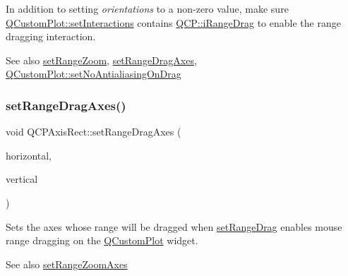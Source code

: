 In addition to setting {\itshape orientations} to a non-\/zero value, make sure \mbox{\hyperlink{class_q_custom_plot_a5ee1e2f6ae27419deca53e75907c27e5}{Q\+Custom\+Plot\+::set\+Interactions}} contains \mbox{\hyperlink{namespace_q_c_p_a2ad6bb6281c7c2d593d4277b44c2b037a2c4432b9aceafb94000be8d1b589ef18}{Q\+C\+P\+::i\+Range\+Drag}} to enable the range dragging interaction.

\begin{DoxySeeAlso}{See also}
\mbox{\hyperlink{class_q_c_p_axis_rect_a7960a9d222f1c31d558b064b60f86a31}{set\+Range\+Zoom}}, \mbox{\hyperlink{class_q_c_p_axis_rect_a648cce336bd99daac4a5ca3e5743775d}{set\+Range\+Drag\+Axes}}, \mbox{\hyperlink{class_q_custom_plot_a775bdcb6329d44701aeaa6135b0e5265}{Q\+Custom\+Plot\+::set\+No\+Antialiasing\+On\+Drag}} 
\end{DoxySeeAlso}
\mbox{\label{class_q_c_p_axis_rect_a648cce336bd99daac4a5ca3e5743775d}} 
\subsubsection{\texorpdfstring{set\+Range\+Drag\+Axes()}{setRangeDragAxes()}}
{\footnotesize\ttfamily void Q\+C\+P\+Axis\+Rect\+::set\+Range\+Drag\+Axes (\begin{DoxyParamCaption}\item[{\mbox{\hyperlink{class_q_c_p_axis}{Q\+C\+P\+Axis}} $\ast$}]{horizontal,  }\item[{\mbox{\hyperlink{class_q_c_p_axis}{Q\+C\+P\+Axis}} $\ast$}]{vertical }\end{DoxyParamCaption})}

Sets the axes whose range will be dragged when \mbox{\hyperlink{class_q_c_p_axis_rect_ae6aef2f7211ba6097c925dcd26008418}{set\+Range\+Drag}} enables mouse range dragging on the \mbox{\hyperlink{class_q_custom_plot}{Q\+Custom\+Plot}} widget.

\begin{DoxySeeAlso}{See also}
\mbox{\hyperlink{class_q_c_p_axis_rect_a9442cca2aa358405f39a64d51eca13d2}{set\+Range\+Zoom\+Axes}} 
\end{DoxySeeAlso}
\mbox{\label{class_q_c_p_axis_rect_a7960a9d222f1c31d558b064b60f86a31}} 
